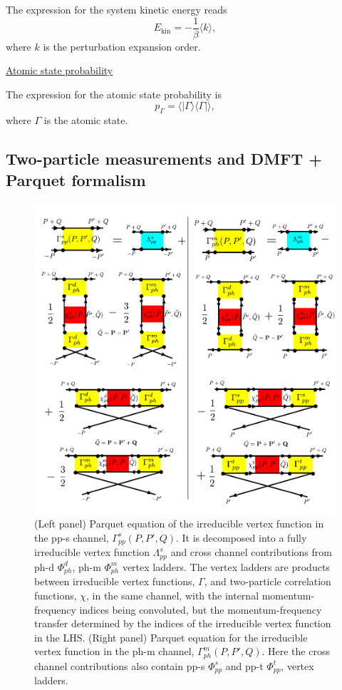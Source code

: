 The expression for the system kinetic energy reads
\begin{equation}
\label{eq:kin}
E_\text{kin} = -\frac{1}{\beta} \langle k \rangle,
\end{equation}
where $k$ is the perturbation expansion order.

\underline{Atomic state probability}

The expression for the atomic state probability is 
\begin{equation}
p_{\Gamma} = \langle |\Gamma \rangle \langle \Gamma| \rangle,
\end{equation}
where $\Gamma$ is the atomic state.

\subsection{Two-particle measurements and DMFT + Parquet formalism}

\begin{figure}[tp]
\centering
\includegraphics[width=\textwidth]{figure/parquet_pp_s_ph_m.pdf}
\caption{(Left panel) Parquet equation of the irreducible vertex function in the pp-s channel, $\Gamma^{s}_{pp}(P,P',Q)$. It is decomposed into a fully irreducible vertex function $\Lambda^{s}_{pp}$ and cross channel contributions from ph-d $\Phi^{d}_{ph}$, ph-m $\Phi^{m}_{ph}$ vertex ladders. The vertex ladders are products between irreducible vertex functions, $\Gamma$, and two-particle correlation functions, $\chi$, in the same channel, with the internal momentum-frequency indices being convoluted, but the momentum-frequency transfer determined by the indices of the irreducible vertex function in the LHS. (Right panel) Parquet equation for the irreducible vertex function in the ph-m channel, $\Gamma^{m}_{ph}(P,P',Q)$. Here the cross channel contributions also contain pp-s $\Phi^{s}_{pp}$ and pp-t $\Phi^{t}_{pp}$, vertex ladders.} \label{fig:parquet_pp_ph}
\end{figure}

